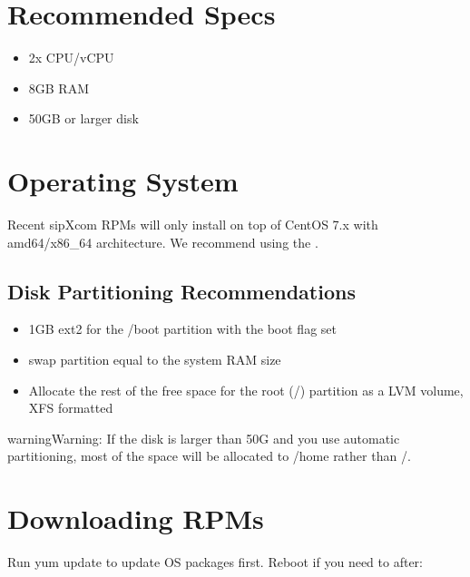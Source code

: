 \documentclass[letterpaper,10pt,english]{sphinxmanual}
\begin{document}
\section{Recommended Specs}
\label{\detokenize{installation:recommended-specs}}\begin{itemize}
\item {} 
2x CPU/vCPU

\item {} 
8GB RAM

\item {} 
50GB or larger disk

\end{itemize}


\section{Operating System}
\label{\detokenize{installation:operating-system}}
Recent sipXcom RPMs will only install on top of CentOS 7.x with amd64/x86\_64 architecture. We recommend using the .


\subsection{Disk Partitioning Recommendations}
\label{\detokenize{installation:disk-partitioning-recommendations}}\begin{itemize}
\item {} 
1GB ext2 for the /boot partition with the boot flag set

\item {} 
swap partition equal to the system RAM size

\item {} 
Allocate the rest of the free space for the root (/) partition as a LVM volume, XFS formatted

\end{itemize}

\begin{sphinxadmonition}{warning}{Warning:}
If the disk is larger than 50G and you use automatic partitioning, most of the space will be allocated to /home rather than /.
\end{sphinxadmonition}


\section{Downloading RPMs}
\label{\detokenize{installation:downloading-rpms}}
Run yum update to update OS packages first. Reboot if you need to after:
\end{document}

